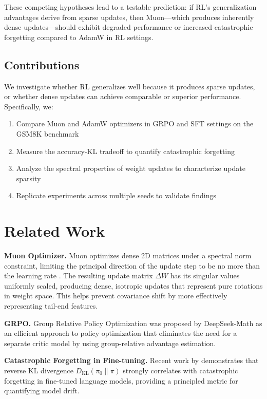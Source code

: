 \documentclass[11pt]{article}
\begin{document}
These competing hypotheses lead to a testable prediction: if RL's generalization advantages derive from sparse updates, then Muon---which produces inherently dense updates---should exhibit degraded performance or increased catastrophic forgetting compared to AdamW in RL settings.

\subsection{Contributions}

We investigate whether RL generalizes well because it produces sparse updates, or whether dense updates can achieve comparable or superior performance. Specifically, we:

\begin{enumerate}
    \item Compare Muon and AdamW optimizers in GRPO and SFT settings on the GSM8K benchmark
    \item Measure the accuracy-KL tradeoff to quantify catastrophic forgetting
    \item Analyze the spectral properties of weight updates to characterize update sparsity
    \item Replicate experiments across multiple seeds to validate findings
\end{enumerate}

\section{Related Work}

\textbf{Muon Optimizer.} Muon optimizes dense 2D matrices under a spectral norm constraint, limiting the principal direction of the update step to be no more than the learning rate \citep{jordan2024muon}. The resulting update matrix $\Delta W$ has its singular values uniformly scaled, producing dense, isotropic updates that represent pure rotations in weight space. This helps prevent covariance shift by more effectively representing tail-end features.

\textbf{GRPO.} Group Relative Policy Optimization was proposed by DeepSeek-Math \citep{shao2024deepseekmath} as an efficient approach to policy optimization that eliminates the need for a separate critic model by using group-relative advantage estimation.

\textbf{Catastrophic Forgetting in Fine-tuning.} Recent work by \citet{shenfeld2025kl} demonstrates that reverse KL divergence $D_{\text{KL}}(\pi_0 \| \pi)$ strongly correlates with catastrophic forgetting in fine-tuned language models, providing a principled metric for quantifying model drift.
\end{document}
